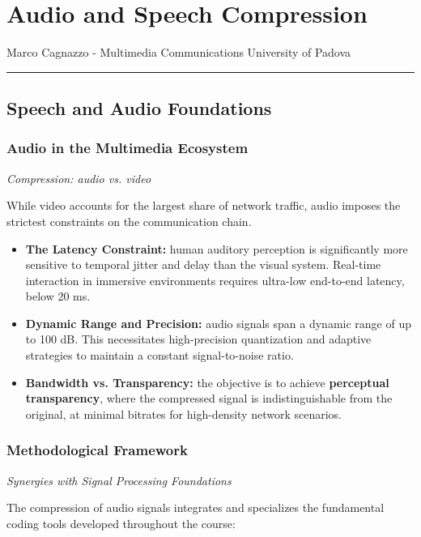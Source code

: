 \chapter{Audio and Speech Compression}

Marco Cagnazzo - Multimedia Communications University of Padova

\bigskip\hrule\bigskip

\section{Speech and Audio Foundations}

\subsection{Audio in the Multimedia Ecosystem}

\textit{Compression: audio vs. video}

While video accounts for the largest share of network traffic, audio imposes the strictest constraints on the communication chain.

\begin{itemize}
\item \textbf{The Latency Constraint:} human auditory perception is significantly more sensitive to temporal jitter and delay than the visual system. Real-time interaction in immersive environments requires ultra-low end-to-end latency, below 20 ms.
\item \textbf{Dynamic Range and Precision:} audio signals span a dynamic range of up to 100 dB. This necessitates high-precision quantization and adaptive strategies to maintain a constant signal-to-noise ratio.
\item \textbf{Bandwidth vs. Transparency:} the objective is to achieve \textbf{perceptual transparency}, where the compressed signal is indistinguishable from the original, at minimal bitrates for high-density network scenarios.
\end{itemize}

\subsection{Methodological Framework}

\textit{Synergies with Signal Processing Foundations}

The compression of audio signals integrates and specializes the fundamental coding tools developed throughout the course:

